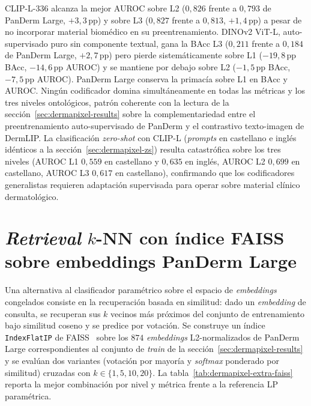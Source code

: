 CLIP-L-336 alcanza la mejor AUROC sobre L2 ($0{,}826$ frente a
$0{,}793$ de PanDerm Large, $+3{,}3$\,pp) y sobre L3
($0{,}827$ frente a $0{,}813$, $+1{,}4$\,pp) a pesar de no
incorporar material biomédico en su preentrenamiento. DINOv2 ViT-L,
auto-supervisado puro sin componente textual, gana la BAcc L3
($0{,}211$ frente a $0{,}184$ de PanDerm Large,
$+2{,}7$\,pp) pero pierde sistemáticamente sobre L1
($-19{,}8$\,pp BAcc, $-14{,}6$\,pp AUROC) y se mantiene por
debajo sobre L2 ($-1{,}5$\,pp BAcc, $-7{,}5$\,pp AUROC).
PanDerm Large conserva la primacía sobre L1 en BAcc y AUROC.
Ningún codificador domina simultáneamente en todas las métricas y
los tres niveles ontológicos, patrón coherente con la lectura de la
sección~\ref{sec:dermapixel-results} sobre la complementariedad
entre el preentrenamiento auto-supervisado de PanDerm y el
contrastivo texto-imagen de DermLIP. La clasificación
\emph{zero-shot} con CLIP-L (\emph{prompts} en castellano e
inglés idénticos a la sección~\ref{sec:dermapixel-zs}) resulta
catastrófica sobre los tres niveles (AUROC L1 $0{,}559$ en
castellano y $0{,}635$ en inglés, AUROC L2 $0{,}699$ en
castellano, AUROC L3 $0{,}617$ en castellano), confirmando que los
codificadores generalistas requieren adaptación supervisada para
operar sobre material clínico dermatológico.

\section{\emph{Retrieval} $k$-NN con índice FAISS sobre
embeddings PanDerm Large}
\label{sec:dermapixel-extra-faiss}

Una alternativa al clasificador paramétrico sobre el espacio de
\emph{embeddings} congelados consiste en la recuperación basada en
similitud: dado un \emph{embedding} de consulta, se recuperan sus
$k$ vecinos más próximos del conjunto de entrenamiento bajo
similitud coseno y se predice por votación. Se construye un índice
\texttt{IndexFlatIP} de FAISS~\cite{faiss2019} sobre los
$874$ \emph{embeddings} L2-normalizados de PanDerm Large
correspondientes al conjunto de \emph{train} de la
sección~\ref{sec:dermapixel-results} y se evalúan dos variantes
(votación por mayoría y \emph{softmax} ponderado por
similitud) cruzadas con $k \in \{1, 5, 10, 20\}$. La
tabla~\ref{tab:dermapixel-extra-faiss} reporta la mejor combinación
por nivel y métrica frente a la referencia LP paramétrica.

